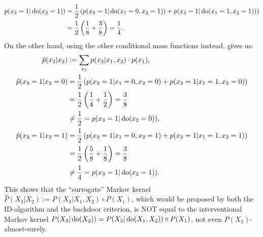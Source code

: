 \begin{Eg}
\begin{align*}
            p(x_3=1|\operatorname{do}(x_2=1)) & = \frac{1}{2} \left ( p(x_3=1|\operatorname{do}(x_1=0,x_2=1)) + p(x_3=1|\operatorname{do}(x_1=1,x_2=1)) \right )  \\ 
            &= \frac{1}{2} \left ( \frac{1}{8} + \frac{3}{8}  \right ) = \frac{1}{4}.
    \end{align*}
    On the other hand, using the other conditional mass functions instead, gives us:
    \begin{align*}
         \hat p(x_3|x_2) & := \sum_{x_1} p(x_3|x_1,x_2) \cdot p(x_1),\\
         \hat p(x_3=1|x_2=0) & = \frac{1}{2} \left ( p(x_3=1|x_1=0,x_2=0) + p(x_3=1|x_1=1,x_2=0) \right )  \\
         &= \frac{1}{2} \left ( \frac{1}{4} + \frac{1}{2} \right ) = \frac{3}{8} \\& \neq \frac{1}{2} =p(x_3=1|\operatorname{do}(x_2=0)), \\
         \hat p(x_3=1|x_2=1) & = \frac{1}{2} \left ( p(x_3=1|x_1=0,x_2=1) + p(x_3=1|x_1=1,x_2=1) \right )  \\ 
         &= \frac{1}{2} \left ( \frac{5}{8} + \frac{1}{8}  \right ) = \frac{3}{8} \\& \neq \frac{1}{4} =p(x_3=1|\operatorname{do}(x_2=1)).
     \end{align*}
     This shows that the ``surrogate'' Markov kernel $\hat P(X_3|X_2) := P(X_3|X_1,X_2) \circ P(X_1)$, 
     which would be proposed by both the ID-algorithm and the backdoor criterion, 
     is NOT equal to the interventional Markov kernel
     $P(X_3|\operatorname{do}(X_2)) = P(X_3|\operatorname{do}(X_1,X_2)) \circ P(X_1) $, not even $P(X_2)$-almost-surely.
 \end{Eg}

